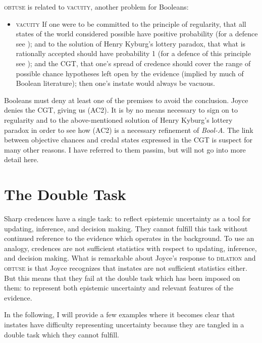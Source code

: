 \documentclass[11pt]{article}
\newcommand{\anderson}[0]{\textit{Bool-A}}
\begin{document}
\textsc{obtuse} is related to \textsc{vacuity}, another problem for
Booleans:

\begin{itemize}
\item \textsc{vacuity} If one were to be committed to the principle of
  regularity, that all states of the world considered possible have
  positive probability (for a defence see
  ); and to the solution of Henry
  Kyburg's lottery paradox, that what is rationally accepted should
  have probability 1 (for a defence of this principle see
  ); and the CGT, that one's spread of
  credence should cover the range of possible chance hypotheses left
  open by the evidence (implied by much of Boolean literature); then
  one's instate would always be vacuous.
\end{itemize}

Booleans must deny at least one of the premises to avoid the
conclusion. Joyce denies the CGT, giving us (AC2). It is by no means
necessary to sign on to regularity and to the above-mentioned solution
of Henry Kyburg's lottery paradox in order to see how (AC2) is a
necessary refinement of {\anderson}. The link between objective
chances and credal states expressed in the CGT is suspect for many
other reasons. I have referred to them passim, but will not go into
more detail here.

\section{The Double Task}
\label{TheDoubleTask}

Sharp credences have a single task: to reflect epistemic uncertainty
as a tool for updating, inference, and decision making. They cannot
fulfill this task without continued reference to the evidence which
operates in the background. To use an analogy, credences are not
sufficient statistics with respect to updating, inference, and
decision making. What is remarkable about Joyce's response to
\textsc{dilation} and \textsc{obtuse} is that Joyce recognizes that
instates are not sufficient statistics either. But this means that
they fail at the double task which has been imposed on them: to
represent both epistemic uncertainty and relevant features of the
evidence.

In the following, I will provide a few examples where it becomes clear
that instates have difficulty representing uncertainty because they
are tangled in a double task which they cannot fulfill.
\end{document}
